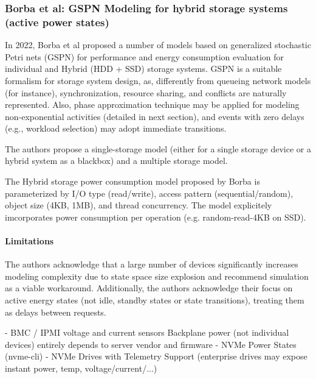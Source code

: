 \subsubsection{Borba et al: GSPN Modeling for hybrid storage systems (active power states)}
In 2022, Borba et al\parencite{borbaModelingApproachEstimating2022} proposed a number of models based on generalized stochastic Petri nets (GSPN) for performance and energy consumption evaluation for individual and Hybrid (HDD + SSD) storage systems. GSPN is a suitable formalism for storage system design, as, differently from queueing network models (for instance), synchronization, resource sharing, and conflicts are naturally represented. Also, phase approximation technique may be applied for modeling non-exponential activities (detailed in next section), and events with zero delays (e.g., workload selection) may adopt immediate transitions. 

The authors propose a single-storage model (either for a single storage device or a hybrid system as a blackbox) and a multiple storage model.

The Hybrid storage power consumption model proposed by Borba is parameterized by I/O type (read/write), access pattern (sequential/random), object size (4KB, 1MB), and thread concurrency. The model explicitely imcorporates power consumption per operation (e.g. random-read-4KB on SSD).

\paragraph{Limitations}
The authors acknowledge that a large number of devices significantly increases modeling complexity due to state space size explosion and recommend simulation as a viable workaround. Additionally, the authors acknowledge their focus on active energy states (not idle, standby states or state transitions), treating them as delays between requests. 








- BMC / IPMI voltage and current sensors
    Backplane power (not individual devices)
    entirely depends to server vendor and firmware
- NVMe Power States (nvme-cli)
- NVMe Drives with Telemetry Support (enterprise drives may expose instant power, temp, voltage/current/...)


